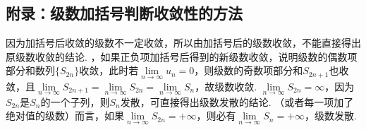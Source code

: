 \documentclass[12pt,UTF8]{ctexart}
\begin{document}
\subsection{附录：级数加括号判断收敛性的方法}
因为加括号后收敛的级数不一定收敛，所以由加括号后的级数收敛，不能直接得出原级数收敛的结论.
\newline
{}，如果正负项加括号后得到的新级数收敛，说明级数的偶数项部分和数列$\{S_{2n}\}$收敛，此时若$\lim\limits_{n\rightarrow\infty}u_n=0$，则级数的奇数项部分和$S_{2n+1}$也收敛，且$\lim\limits_{n\rightarrow\infty}S_{2n+1}=\lim\limits_{n\rightarrow\infty}S_{2n}=\lim\limits_{n\rightarrow\infty}S_n$，故级数收敛. 
\newline
{}$\lim\limits_{n\rightarrow\infty}S_{2n}=\infty$，因为$S_{2n}$是$S_n$的一个子列，则$S_n$发散，可直接得出级数发散的结论.
\newline
{}（或者每一项加了绝对值的级数）而言，如果$\lim\limits_{n\rightarrow\infty}S_{2n}=+\infty$，则必有$\lim\limits_{n\rightarrow\infty}S_n=+\infty$，级数发散.
\end{document}
